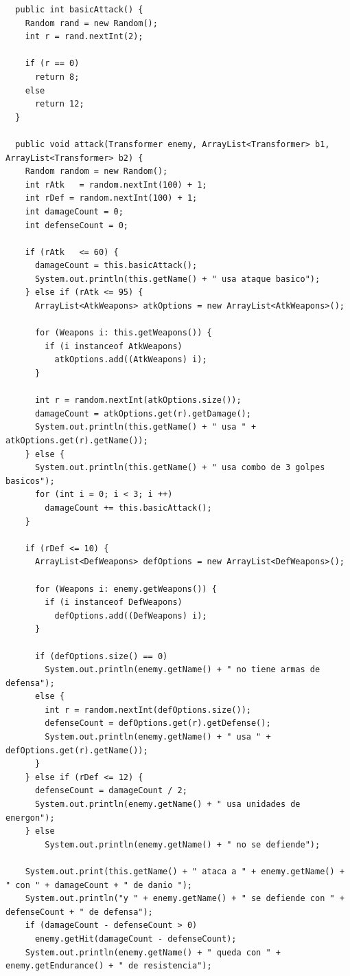 \documentclass[12pt]{article}
\begin{document}
\begin{enumerate}[label = \arabic{enumi}]
\begin{lstlisting}
  public int basicAttack() {
    Random rand = new Random();
    int r = rand.nextInt(2);

    if (r == 0) 
      return 8;
    else 
      return 12;
  }

  public void attack(Transformer enemy, ArrayList<Transformer> b1, ArrayList<Transformer> b2) {
    Random random = new Random();
    int rAtk   = random.nextInt(100) + 1;
    int rDef = random.nextInt(100) + 1;
    int damageCount = 0;
    int defenseCount = 0;

    if (rAtk   <= 60) {
      damageCount = this.basicAttack();
      System.out.println(this.getName() + " usa ataque basico");
    } else if (rAtk <= 95) {
      ArrayList<AtkWeapons> atkOptions = new ArrayList<AtkWeapons>();

      for (Weapons i: this.getWeapons()) {
        if (i instanceof AtkWeapons)
          atkOptions.add((AtkWeapons) i);
      }

      int r = random.nextInt(atkOptions.size());
      damageCount = atkOptions.get(r).getDamage();
      System.out.println(this.getName() + " usa " + atkOptions.get(r).getName());
    } else {
      System.out.println(this.getName() + " usa combo de 3 golpes basicos");
      for (int i = 0; i < 3; i ++)
        damageCount += this.basicAttack();
    }

    if (rDef <= 10) {
      ArrayList<DefWeapons> defOptions = new ArrayList<DefWeapons>();

      for (Weapons i: enemy.getWeapons()) {
        if (i instanceof DefWeapons) 
          defOptions.add((DefWeapons) i);
      }
      
      if (defOptions.size() == 0) 
        System.out.println(enemy.getName() + " no tiene armas de defensa");
      else {
        int r = random.nextInt(defOptions.size());
        defenseCount = defOptions.get(r).getDefense();
        System.out.println(enemy.getName() + " usa " + defOptions.get(r).getName());
      }
    } else if (rDef <= 12) {
      defenseCount = damageCount / 2;
      System.out.println(enemy.getName() + " usa unidades de energon");
    } else 
        System.out.println(enemy.getName() + " no se defiende");

    System.out.print(this.getName() + " ataca a " + enemy.getName() + " con " + damageCount + " de danio ");
    System.out.println("y " + enemy.getName() + " se defiende con " + defenseCount + " de defensa");
    if (damageCount - defenseCount > 0)
      enemy.getHit(damageCount - defenseCount);
    System.out.println(enemy.getName() + " queda con " + enemy.getEndurance() + " de resistencia");


\end{lstlisting}
\end{enumerate}
\end{document}
